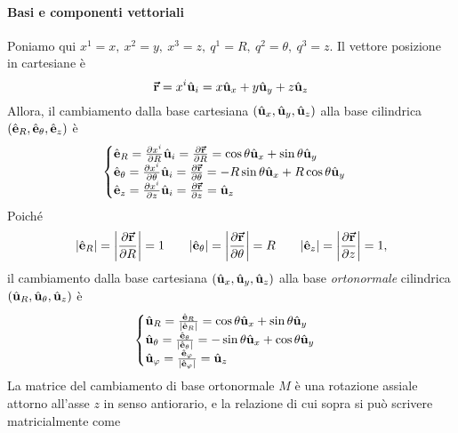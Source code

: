 \paragraph{Basi e componenti vettoriali}
Poniamo qui $x^1=x,\ x^2=y,\ x^3=z,\ q^1=R,\ q^2=\theta,\ q^3=z$.
Il vettore posizione in cartesiane è
\begin{equation*}
	\vb*{\va{r}}=x^i\hat{\mathbf{u}}_i=x\hat{\mathbf{u}}_x+y\hat{\mathbf{u}}_y+z\hat{\mathbf{u}}_z
\end{equation*}
Allora, il cambiamento dalla base cartesiana $\left(\hat{\mathbf{u}}_x,\hat{\mathbf{u}}_y,\hat{\mathbf{u}}_z\right)$ alla base cilindrica $\left(\hat{\mathbf{e}}_R,\hat{\mathbf{e}}_\theta,\hat{\mathbf{e}}_z\right)$ è
\begin{equation}
	\begin{cases}
		\hat{\mathbf{e}}_R=\pdv{x^i}{R}\hat{\mathbf{u}}_i=\pdv{\vb*{\va{r}}}{R}=\cos\theta\hat{\mathbf{u}}_x+\sin\theta\hat{\mathbf{u}}_y\\
		\hat{\mathbf{e}}_\theta=\pdv{x^i}{\theta}\hat{\mathbf{u}}_i=\pdv{\vb*{\va{r}}}{\theta}=-R\sin\theta\hat{\mathbf{u}}_x+R\cos\theta\hat{\mathbf{u}}_y\\
		\hat{\mathbf{e}}_z=\pdv{x^i}{z}\hat{\mathbf{u}}_i=\pdv{\vb*{\va{r}}}{z}=\hat{\mathbf{u}}_z
	\end{cases}
\end{equation}
Poiché
\begin{equation}
	\abs{\hat{\mathbf{e}}_R}=\abs{\pdv{\vb*{\va{r}}}{R}}=1\qquad\abs{\hat{\mathbf{e}}_\theta}=\abs{\pdv{\vb*{\va{r}}}{\theta}}=R\qquad\abs{\hat{\mathbf{e}}_z}=\abs{\pdv{\vb*{\va{r}}}{z}}=1,
\end{equation}
il cambiamento dalla base cartesiana $\left(\hat{\mathbf{u}}_x,\hat{\mathbf{u}}_y,\hat{\mathbf{u}}_z\right)$ alla base \textit{ortonormale} cilindrica $\left(\hat{\mathbf{u}}_R,\hat{\mathbf{u}}_\theta,\hat{\mathbf{u}}_z\right)$ è
\begin{equation}
	\begin{cases}
		\hat{\mathbf{u}}_R=\frac{\hat{\mathbf{e}}_R}{\abs{\hat{\mathbf{e}}_R}}=\cos\theta\hat{\mathbf{u}}_x+\sin\theta\hat{\mathbf{u}}_y\\
		\hat{\mathbf{u}}_\theta=\frac{\hat{\mathbf{e}}_\theta}{\abs{\hat{\mathbf{e}}_\theta}}=-\sin\theta\hat{\mathbf{u}}_x+\cos\theta\hat{\mathbf{u}}_y\\
		\hat{\mathbf{u}}_\varphi=\frac{\hat{\mathbf{e}}_\varphi}{\abs{\hat{\mathbf{e}}_\varphi}}=\hat{\mathbf{u}}_z
	\end{cases}
\end{equation}
La matrice del cambiamento di base ortonormale $M$ è una rotazione assiale attorno all'asse $z$ in senso antiorario, e la relazione di cui sopra si può scrivere matricialmente come
